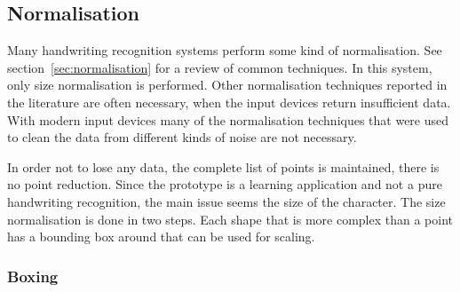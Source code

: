 \subsection{Normalisation}
\label{sec:hwre:normalisation}

Many handwriting recognition systems perform some kind of normalisation.
See section~\ref{sec:normalisation} for a review of common techniques.
In this system, only size normalisation is performed. Other normalisation 
techniques reported in the literature are often necessary, when the input 
devices return insufficient data. With modern input devices many of the 
normalisation techniques that were used to clean the data from different
kinds of noise are not necessary.

In order not to lose any data, the complete list of points is maintained,
there is no point reduction. Since the prototype is a learning application and 
not a pure handwriting recognition, the main issue seems the size of the 
character. The size normalisation is done in two steps. Each shape that
is more complex than a point has a bounding box around that can be used for 
scaling.

\subsubsection{Boxing}
\label{sec:hwre:boxing}

